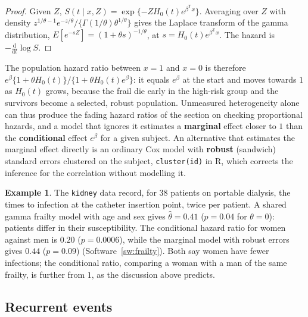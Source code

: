 \documentclass[11pt,a4paper]{article}
\numberwithin{equation}{section}
\theoremstyle{definition}
\newtheorem{exa}[thm]{Example}
\begin{document}
\begin{proof}
Given $Z$, $S(t \mid x, Z) = \exp\{-ZH_0(t)e^{\beta^{\mathsf T}x}\}$. Averaging over $Z$ with density $z^{1/\theta - 1}e^{-z/\theta}/\{\Gamma(1/\theta)\theta^{1/\theta}\}$ gives the Laplace transform of the gamma distribution, $E[e^{-sZ}] = (1 + \theta s)^{-1/\theta}$, at $s = H_0(t)e^{\beta^{\mathsf T}x}$. The hazard is $-\frac{\mathrm d}{\mathrm dt}\log S$.
\end{proof}

The population hazard ratio between $x = 1$ and $x = 0$ is therefore $e^{\beta}\{1 + \theta H_0(t)\}/\{1 + \theta H_0(t)e^{\beta}\}$: it equals $e^\beta$ at the start and moves towards $1$ as $H_0(t)$ grows, because the frail die early in the high-risk group and the survivors become a selected, robust population. Unmeasured heterogeneity alone can thus produce the fading hazard ratios of the section on checking proportional hazards, and a model that ignores it
estimates a \textbf{marginal} effect closer to $1$ than the \textbf{conditional} effect $e^\beta$ for a given subject. An alternative that estimates the marginal effect directly is an ordinary Cox model with \textbf{robust} (sandwich) standard errors clustered on the subject, \texttt{cluster(id)} in R, which corrects the inference for the correlation without modelling it.

\begin{exa}
\label{ex:kidney}
The \texttt{kidney} data record, for $38$ patients on portable dialysis, the times to infection at the catheter insertion point, twice per patient. A shared gamma frailty model with age and sex gives $\hat\theta = 0.41$ ($p = 0.04$ for $\theta = 0$): patients differ in their susceptibility. The conditional hazard ratio for women against men is $0.20$ ($p = 0.0006$), while the marginal model with robust errors gives $0.44$
($p = 0.09$) (Software~\ref{sw:frailty}). Both say women have fewer infections; the conditional ratio, comparing a woman with a man of the same frailty, is further from $1$, as the discussion above predicts.
\end{exa}

\subsection{Recurrent events}
\label{ssec:recurrent}
\end{document}
